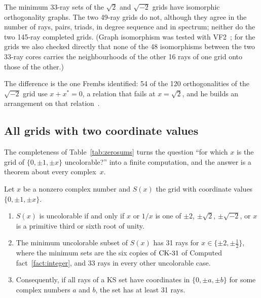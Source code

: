 \begin{fact}\label{fact:pools}
The minimum 33-ray sets of the $\sqrt2$ and $\sqrt{-2}$ grids have isomorphic orthogonality
graphs.  The two 49-ray grids do not, although they agree in the number of rays, pairs, triads,
in degree sequence and in spectrum; neither do the two 145-ray completed grids.  (Graph
isomorphism was tested with VF2~\cite{Cordella2004VF2}; for the grids we also checked directly
that none of the 48 isomorphisms between the two 33-ray cores carries the neighbourhoods of the
other 16 rays of one grid onto those of the other.)
\end{fact}

The difference is the one Frembs identified: 54 of the 120 orthogonalities of the $\sqrt{-2}$
grid use $x+x^{*}=0$, a relation that fails at $x=\sqrt2$, and he builds an arrangement on that
relation~\cite{Frembs2026}.

\subsection{All grids with two coordinate values}\label{sec:twosymbol}

The completeness of Table~\ref{tab:zerosums} turns the question ``for which $x$ is the grid of
$\{0,\pm1,\pm x\}$ uncolorable?'' into a finite computation, and the answer is a theorem about
every complex~$x$.

\begin{theorem}\label{thm:twosymbol}
Let $x$ be a nonzero complex number and $S(x)$ the grid with coordinate values
$\{0,\pm1,\pm x\}$.
\begin{enumerate}[label=(\roman*)]
\item $S(x)$ is uncolorable if and only if $x$ or $1/x$ is one of $\pm2$, $\pm\sqrt2$,
$\pm\sqrt{-2}$, or $x$ is a primitive third or sixth root of unity.
\item The minimum uncolorable subset of $S(x)$ has 31 rays for $x\in\{\pm2,\pm\tfrac12\}$, where
the minimum sets are the six copies of $\mathrm{CK}\text{-}31$ of Computed fact~\ref{fact:integer}, and 33 rays in
every other uncolorable case.
\item Consequently, if all rays of a KS set have coordinates in $\{0,\pm a,\pm b\}$ for some
complex numbers $a$ and $b$, the set has at least 31 rays.
\end{enumerate}
\end{theorem}

